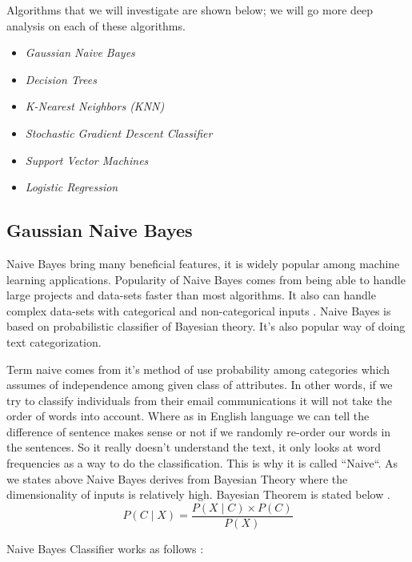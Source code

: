 \documentclass[sigconf]{acmart}
\begin{document}
\par Algorithms that we will investigate are shown below; we will go more deep analysis on each of these algorithms. 

\begin{itemize}
    \item \textit{Gaussian Naive Bayes}
    \item \textit{Decision Trees}
    \item \textit{K-Nearest Neighbors (KNN)}
    \item \textit{Stochastic Gradient Descent Classifier}
    \item \textit{Support Vector Machines}
    \item \textit{Logistic Regression} 
\end{itemize}

\subsection{Gaussian Naive Bayes}
Naive Bayes bring many beneficial features, it is widely popular among machine learning applications\cite{tapan-kumar}. Popularity of Naive Bayes comes from being able to handle large projects and data-sets faster than most algorithms\cite{tapan-kumar}. It also can handle complex data-sets with categorical and non-categorical inputs \cite{tapan-kumar}. Naive Bayes is based on probabilistic classifier of Bayesian theory. It's also popular way of doing text categorization\cite{www-wikipedia-naivebayes}. 
\par Term naive comes from it's method of use probability among categories which assumes of independence among given class of attributes. In other words, if we try to classify individuals from their email communications it will not take the order of words into account. Where as in English language we can tell the difference of sentence makes sense or not if we randomly re-order our words in the sentences. So it really doesn't understand the text, it only looks at word frequencies as a way to do the classification. This is why it is called ``Naive``.  As we states above Naive Bayes derives from Bayesian Theory where the dimensionality of inputs is relatively high. Bayesian Theorem is stated below \cite{Sayali}. 
\begin{equation}
P(C \mid X) = \frac{P(X \mid C) \times P(C)} {P(X)}
\end{equation}

Naive Bayes Classifier works as follows \cite{Sayali}:
\end{document}

